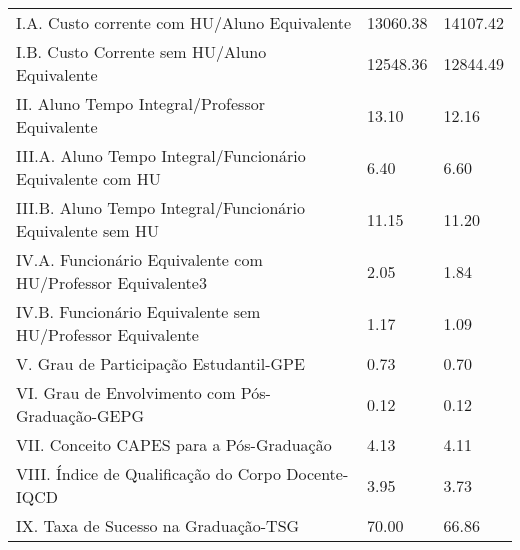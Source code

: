 \documentclass{article}
\begin{document}
\begin{tabular}{lll}
I.A. Custo corrente com HU/Aluno Equivalente                &  13060.38 &  14107.42 \\
I.B. Custo Corrente sem HU/Aluno Equivalente                &  12548.36 &  12844.49 \\
II. Aluno Tempo Integral/Professor Equivalente              &  13.10 &  12.16 \\
III.A. Aluno Tempo Integral/Funcionário Equivalente com HU  &  6.40 &  6.60 \\
III.B. Aluno Tempo Integral/Funcionário Equivalente sem HU  &  11.15 &  11.20 \\
IV.A. Funcionário Equivalente com HU/Professor Equivalente3 &  2.05 &  1.84 \\
IV.B. Funcionário Equivalente sem HU/Professor Equivalente  &  1.17 &  1.09 \\
V. Grau de Participação Estudantil-GPE                      &  0.73 &  0.70 \\
VI. Grau de Envolvimento com Pós-Graduação-GEPG             &  0.12 &  0.12 \\
VII. Conceito CAPES para a Pós-Graduação                    &  4.13 &  4.11 \\
VIII. Índice de Qualificação do Corpo Docente-IQCD          &  3.95 &  3.73 \\
IX. Taxa de Sucesso na Graduação-TSG                        &  70.00 &  66.86 \\
\bottomrule
\end{tabular}
\newpage
\end{document}
